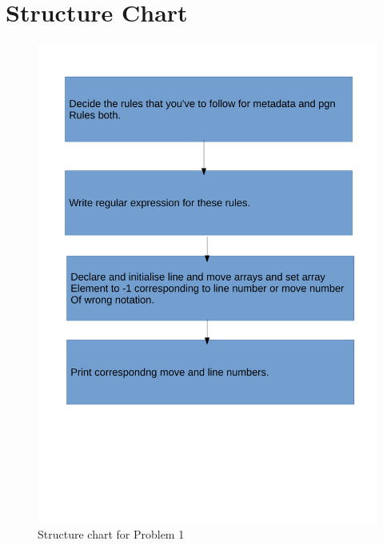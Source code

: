 \documentclass[11pt]{report}
\begin{document}
\section{Structure Chart}
\begin{figure}[h!]
\centering
\includegraphics[scale=0.5]{images/sc1}
\caption{Structure chart for Problem 1}	
\end{figure}
\pagebreak
\end{document}
